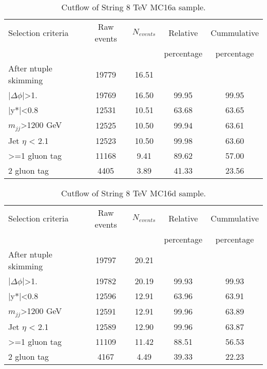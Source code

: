 \begin{table}[ht]
\begin{center}
\begin{tabular}{|l|c|c|c|c|}
\hline
Selection criteria & Raw events & $N_{events}$ & Relative & Cummulative \\
 & & & percentage & percentage \\
\hline
After ntuple skimming & 19779 & 16.51 &  &  \\
$|\Delta\phi|$>1. & 19769 & 16.50 & 99.95 & 99.95 \\
|y*|<0.8 & 12531 & 10.51 & 63.68 & 63.65 \\
$m_{jj}$>1200 GeV & 12525 & 10.50 & 99.94 & 63.61 \\
Jet $\eta$ < 2.1 & 12523 & 10.50 & 99.98 & 63.60 \\
>=1 gluon tag & 11168 & 9.41 & 89.62 & 57.00 \\
2 gluon tag & 4405 & 3.89 & 41.33 & 23.56 \\
\hline
\end{tabular}
\end{center}
\caption{Cutflow of String 8 TeV MC16a sample.}
\end{table}

\begin{table}[ht]
\begin{center}
\begin{tabular}{|l|c|c|c|c|}
\hline
Selection criteria & Raw events & $N_{events}$ & Relative & Cummulative \\
 & & & percentage & percentage \\
\hline
After ntuple skimming & 19797 & 20.21 &  &  \\
$|\Delta\phi|$>1. & 19782 & 20.19 & 99.93 & 99.93 \\
|y*|<0.8 & 12596 & 12.91 & 63.96 & 63.91 \\
$m_{jj}$>1200 GeV & 12591 & 12.91 & 99.96 & 63.89 \\
Jet $\eta$ < 2.1 & 12589 & 12.90 & 99.96 & 63.87 \\
>=1 gluon tag & 11109 & 11.42 & 88.51 & 56.53 \\
2 gluon tag & 4167 & 4.49 & 39.33 & 22.23 \\
\hline
\end{tabular}
\end{center}
\caption{Cutflow of String 8 TeV MC16d sample.}
\end{table}


